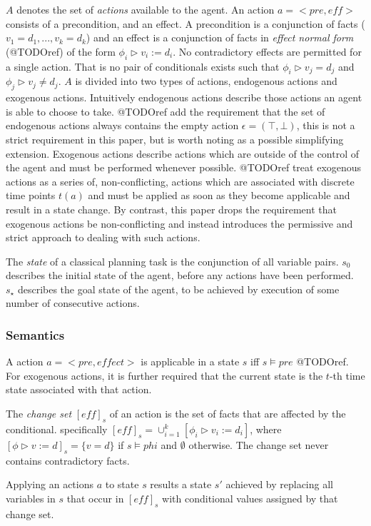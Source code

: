 \documentclass{article}
\theoremstyle{plain}
\theoremstyle{definition}
\begin{document}
$A$ denotes the set of \textit{actions} available to the agent. An action $a=<pre,eff>$ consists of a precondition, and an effect. A precondition is a conjunction of facts ($v_1=d_1,...,v_k=d_k$) and an effect is a conjunction of facts in \textit{effect normal form} (@TODOref) of the form $\phi_i \triangleright v_i:=d_i$. No contradictory effects are permitted for a single action. That is no pair of conditionals exists such that $\phi_i \triangleright v_j=d_j$ and $\phi_j \triangleright v_j \neq d_j$. $A$ is divided into two types of actions, endogenous actions and exogenous actions. Intuitively endogenous actions describe those actions an agent is able to choose to take. @TODOref add the requirement that the set of endogenous actions always contains the empty action $\epsilon=(\top,\bot)$, this is not a strict requirement in this paper, but is worth noting as a possible simplifying extension. Exogenous actions describe actions which are outside of the control of the agent and must be performed whenever possible. @TODOref treat exogenous actions as a series of, non-conflicting, actions which are associated with discrete time points $t(a)$ and must be applied as soon as they become applicable and result in a state change. By contrast, this paper drops the requirement that exogenous actions be non-conflicting and instead introduces the permissive and strict approach to dealing with such actions.

The \textit{state} of a classical planning task is the conjunction of all variable pairs. $s_0$ describes the initial state of the agent, before any actions have been performed. $s_\star$ describes the goal state of the agent, to be achieved by execution of some number of consecutive actions.

\subsubsection*{Semantics}
A action $a=<pre, effect>$ is applicable in a state $s$ iff $s\models pre$ @TODOref. For exogenous actions, it is further required that the current state is the $t$-th time state associated with that action. 

The \textit{change set} $[eff]_s$ of an action is the set of facts that are affected by the conditional. specifically $[eff]_s=\cup^k_{i=1}[\phi_i \triangleright v_i:=d_i]$, where $[\phi \triangleright v:=d]_s=\{v=d\}$ if $s \models phi$ and $\emptyset$ otherwise. The change set never contains contradictory facts.

Applying an actions $a$ to state $s$ results a state $s'$ achieved by replacing all variables in $s$ that occur in $[eff]_s$ with conditional values assigned by that change set.
\end{document}
